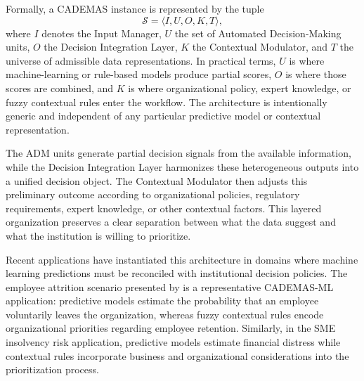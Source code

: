 \documentclass[mathematics,article,submit,moreauthors]{Definitions/mdpi}
\begin{document}
Formally, a CADEMAS instance is represented by the tuple
\begin{equation}
\mathcal{S}=
\langle I, U, O, K, T \rangle,
\end{equation}
where $I$ denotes the Input Manager, $U$ the set of Automated Decision-Making units, $O$ the Decision Integration Layer, $K$ the Contextual Modulator, and $T$ the universe of admissible data representations. In practical terms, $U$ is where machine-learning or rule-based models produce partial scores, $O$ is where those scores are combined, and $K$ is where organizational policy, expert knowledge, or fuzzy contextual rules enter the workflow. The architecture is intentionally generic and independent of any particular predictive model or contextual representation.

The ADM units generate partial decision signals from the available information, while the Decision Integration Layer harmonizes these heterogeneous outputs into a unified decision object. The Contextual Modulator then adjusts this preliminary outcome according to organizational policies, regulatory requirements, expert knowledge, or other contextual factors. This layered organization preserves a clear separation between what the data suggest and what the institution is willing to prioritize.

Recent applications have instantiated this architecture in domains where machine learning predictions must be reconciled with institutional decision policies. The employee attrition scenario presented by \citet{Godz2026} is a representative CADEMAS-ML application: predictive models estimate the probability that an employee voluntarily leaves the organization, whereas fuzzy contextual rules encode organizational priorities regarding employee retention. Similarly, in the SME insolvency risk application, predictive models estimate financial distress while contextual rules incorporate business and organizational considerations into the prioritization process.
\end{document}
